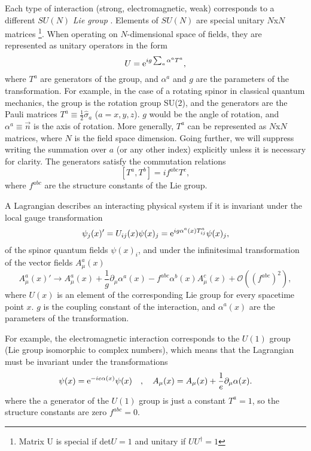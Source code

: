 Each type of interaction (strong, electromagnetic, weak) corresponds to a different $SU(N)$ \emph{Lie group} \cite{fecko}.
Elements of $SU(N)$ are special unitary $N$x$N$ matrices \footnote{Matrix U is special if det$U=1$ and unitary if $UU^{\dagger} = 1$}. 
When operating on $N$-dimensional space of fields, they are represented as unitary operators in the form 
\begin{equation}
    \label{eq:lie_element}
    U = \mathrm{e}^{i g \sum_{a} \alpha^a T^a},
\end{equation}
where $T^a$ are generators of the group, and $\alpha^a$ and $g$  are the parameters of the transformation.
For example, in the case of a rotating spinor in classical quantum mechanics, the group is the rotation group SU(2), and the generators are the Pauli matrices $T^a \equiv \frac12 \hat{\sigma}_a$ ($a = x,y,z$).
$g$ would be the angle of rotation, and $\alpha^a \equiv \vec{n}$ is the axis of rotation.
More generally, $T^a$ can be represented as $N$x$N$ matrices, where $N$ is the field space dimension.
Going further, we will suppress writing the summation over $a$ (or any other index) explicitly unless it is necessary for clarity.
The generators satisfy the commutation relations
\begin{equation}
    \label{eq:commutation}
    [T^a, T^b] = i f^{abc} T^c,
\end{equation}
where $f^{abc}$ are the structure constants of the Lie group.

A Lagrangian describes an interacting physical system if it is invariant under the local gauge transformation
\begin{equation}
    \label{eq:}
    \psi_j(x)' = U_{ij}(x)\psi(x)_j = \mathrm{e}^{i g \alpha^a(x) T^a_{ij}} \psi(x)_j,
\end{equation}
of the spinor quantum fields $\psi(x)_i$, and under the infinitesimal transformation of the vector fields $A^a_\mu(x)$
\begin{equation}
    \label{eq:gauge_inv_bosons}
    A^a_\mu(x)' \rightarrow A^a_\mu(x) + \frac{1}{g} \partial_\mu \alpha^a(x) - f^{abc} \alpha^b(x) A^c_\mu(x) + \mathcal{O}((f^{abc})^2),
\end{equation}
where $U(x)$ is an element of the corresponding Lie group for every spacetime point $x$.
$g$ is the coupling constant of the interaction, and $\alpha^a(x)$ are the parameters of the transformation.


For example, the electromagnetic interaction corresponds to the $U(1)$ group (Lie group isomorphic to complex numbers), which means that the Lagrangian must be invariant under the transformations
\begin{equation}
    \label{eq:gauge_inv_QED}
    \psi(x) = \mathrm{e}^{-i e \alpha(x)}\psi(x) \quad, \quad A_\mu(x) = A_\mu(x) + \frac{1}{e} \partial_\mu \alpha(x).
\end{equation}
where the a generator of the $U(1)$ group is just a constant $T^a = 1$, so the structure constants are zero $f^{abc} = 0$.


